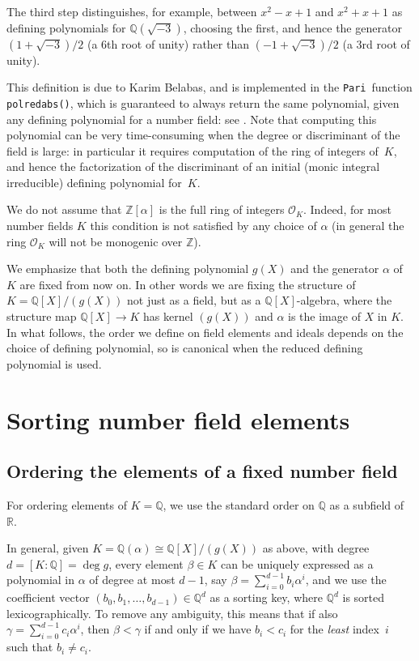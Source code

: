 \documentclass{article}
\def\Pari{{\tt Pari}}
\def\Z{{\mathbb Z}}
\def\Q{{\mathbb Q}}
\def\R{{\mathbb R}}
\def\OO{{\mathcal O}}
\begin{document}
The third step distinguishes, for example, between $x^2-x+1$ and
$x^2+x+1$ as defining polynomials for $\Q(\sqrt{-3})$, choosing the
first, and hence the generator $(1+\sqrt{-3})/2$ (a 6th root of unity)
rather than $(-1+\sqrt{-3})/2$ (a 3rd root of unity).

This definition is due to Karim Belabas, and is implemented in the
\Pari\ function {\tt polredabs()}, which is guaranteed to always
return the same polynomial, given any defining polynomial for a number
field: see \cite{polredabs}.  Note that computing this polynomial can
be very time-consuming when the degree or discriminant of the field is
large: in particular it requires computation of the ring of integers
of~$K$, and hence the factorization of the discriminant of an initial
(monic integral irreducible) defining polynomial for~$K$.

We do not assume that $\Z[\alpha]$ is the full ring of integers
$\OO_K$.  Indeed, for most number fields $K$ this condition is
not satisfied by any choice of $\alpha$ (in general the ring $\OO_K$
will not be monogenic over $\Z$).

We emphasize that both the defining polynomial $g(X)$ and the
generator $\alpha$ of~$K$ are fixed from now on.  In other words we
are fixing the structure of $K=\Q[X]/(g(X))$ not just as a field, but
as a $\Q[X]$-algebra, where the structure map $\Q[X]\to K$ has kernel
$(g(X))$ and $\alpha$ is the image of $X$ in $K$.  In what follows,
the order we define on field elements and ideals depends on the choice
of defining polynomial, so is canonical when the reduced defining
polynomial is used.

\section{Sorting number field elements}
\subsection{Ordering the elements of a fixed number field}\label{sec:ordfix}
For ordering elements of $K=\Q$, we use the standard order on $\Q$ as
a subfield of~$\R$.

In general, given $K=\Q(\alpha)\cong \Q[X]/(g(X))$ as above, with
degree $d=[K:\Q]=\deg g$, every element $\beta\in K$ can be uniquely
expressed as a polynomial in $\alpha$ of degree at most $d-1$, say
$\beta=\sum_{i=0}^{d-1}b_i\alpha^i$, and we use the coefficient vector
$(b_0,b_1,\dots,b_{d-1})\in\Q^d$ as a sorting key, where $\Q^d$ is
sorted lexicographically.  To remove any ambiguity, this means that if
also $\gamma=\sum_{i=0}^{d-1}c_i\alpha^i$, then $\beta<\gamma$ if and
only if we have $b_i<c_i$ for the \textit{least} index~$i$ such that
$b_i\not=c_i$.
\end{document}
